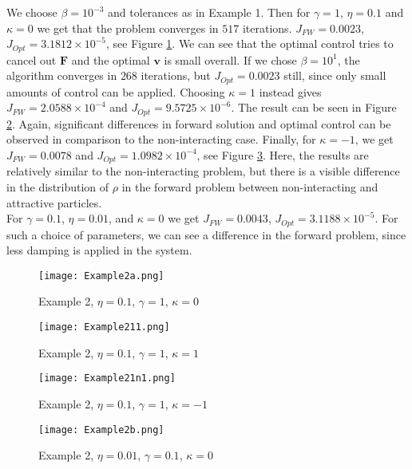 	We choose $ \beta = 10^{-3}$ and tolerances as in Example 1. Then for $\gamma = 1$, $\eta = 0.1$ and $\kappa = 0$ we get that the problem converges in $517$ iterations. $J_{FW} = 0.0023$, $J_{Opt} = 3.1812 \times 10^{-5}$, see Figure \ref{F4}. We can see that the optimal control tries to cancel out $\mathbf F$ and the optimal $\mathbf v$ is small overall. If we chose $\beta = 10^1$, the algorithm converges in $268$ iterations, but $J_{Opt} =0.0023$ still, since only small amounts of control can be applied.
	Choosing $\kappa = 1$ instead gives $J_{FW} = 2.0588 \times 10^{-4}$ and $J_{Opt} = 9.5725 \times 10^{-6}$. The result can be seen in Figure \ref{F4a}. Again, significant differences in forward solution and optimal control can be observed in comparison to the non-interacting case. 
	Finally, for $\kappa = -1$, we get $J_{FW} = 0.0078$ and $J_{Opt} = 1.0982 \times 10^{-4}$, see Figure \ref{F4b}. Here, the results are relatively similar to the non-interacting problem, but there is a visible difference in the distribution of $\rho$ in the forward problem between non-interacting and attractive particles.
	\\
	For $\gamma = 0.1$, $\eta = 0.01$, and $\kappa = 0$ we get $J_{FW} = 0.0043$, $J_{Opt} = 3.1188 \times 10^{-5}$. For such a  choice of parameters, we can see a difference in the forward problem, since less damping is applied in the system.
	
	
	\begin{figure}[h]
		\centering
		\texttt{[image: Example2a.png]}
		\caption{Example 2, $\eta = 0.1$, $\gamma = 1$, $\kappa = 0$} 
		\label{F4}
	\end{figure}
\begin{figure}[h]
	\centering
	\texttt{[image: Example211.png]}
	\caption{Example 2, $\eta = 0.1$, $\gamma = 1$, $\kappa = 1$} 
	\label{F4a}
\end{figure}
\begin{figure}[h]
	\centering
	\texttt{[image: Example21n1.png]}
	\caption{Example 2, $\eta = 0.1$, $\gamma = 1$, $\kappa = -1$} 
	\label{F4b}
\end{figure}

	\begin{figure}[h]
		\centering
		\texttt{[image: Example2b.png]}
		\caption{Example 2, $\eta = 0.01$, $\gamma = 0.1$, $\kappa = 0$} 
		\label{F5}
	\end{figure}
